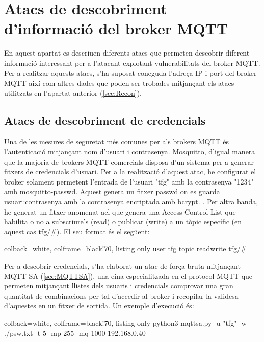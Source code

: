\section{Atacs de descobriment d’informació del broker MQTT}

En aquest apartat es descriuen diferents atacs que permeten descobrir diferent informació interessant per a l'atacant explotant vulnerabilitats del broker MQTT. Per a realitzar aquests atacs, s'ha suposat coneguda l'adreça IP i port del broker MQTT així com altres dades que poden ser trobades mitjançant els atacs utilitzats en l'apartat anterior (\ref{sec:Recon}).


\subsection{Atacs de descobriment de credencials}

Una de les mesures de seguretat més comunes per als brokers MQTT és l'autenticació mitjançant nom d'usuari i contrasenya. Mosquitto, d'igual manera que la majoria de brokers MQTT comercials disposa d'un sistema per a generar fitxers de credencials d'usuari. Per a la realització d'aquest atac, he configurat el broker solament permetent l'entrada de l'usuari "tfg" amb la contrasenya "1234" amb mosquitto-passwd. Aquest genera un fitxer passwd on es guarda usuari:contrasenya amb la contrasenya encriptada amb bcrypt. \cite{bcryptexp}. Per altra banda, he generat un fitxer anomenat acl que genera una Access Control List que habilita o no a subscriure's (read) o publicar (write) a un tòpic específic (en aquest cas tfg/\#). El seu format és el següent:

\begin{tcblisting}{colback=white, colframe=black!70, listing only}
user tfg
topic readwrite tfg/#
\end{tcblisting}

Per a descobrir credencials, s'ha elaborat un atac de força bruta mitjançant MQTT-SA (\ref{sec:MQTTSA}), una eina especialitzada en el protocol MQTT que permeten mitjançant llistes dels usuaris i credencials comprovar una gran quantitat de combinacions per tal d'accedir al broker i recopilar la validesa d'aquestes en un fitxer de sortida. Un exemple d'execució és:

\begin{tcblisting}{colback=white, colframe=black!70, listing only}
 python3 mqttsa.py -u "tfg" -w ./psw.txt -t 5 -mp 255 -mq 1000 192.168.0.40
\end{tcblisting}

